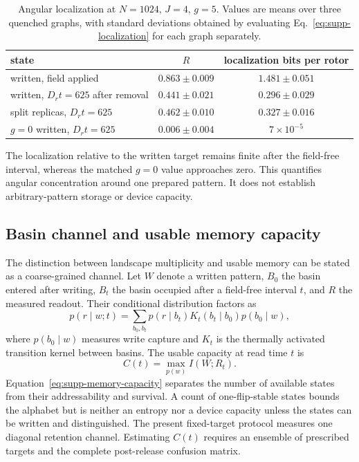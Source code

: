 \documentclass[aps,prl,onecolumn,superscriptaddress,nofootinbib]{revtex4-2}
\begin{document}
\begin{table}[ht]
\centering
\caption{Angular localization at \(N=1024\), \(J=4\), \(g=5\). Values are
means over three quenched graphs, with standard deviations obtained by
evaluating Eq.~\eqref{eq:supp-localization} for each graph separately.}
\label{tab:supp-localization}
\begin{ruledtabular}
\begin{tabular}{lcc}
state & \(R\) & localization bits per rotor\\
\hline
written, field applied & \(0.863\pm0.009\) & \(1.481\pm0.051\)\\
written, \(D_rt=625\) after removal & \(0.441\pm0.021\) & \(0.296\pm0.029\)\\
split replicas, \(D_rt=625\) & \(0.462\pm0.010\) & \(0.327\pm0.016\)\\
\(g=0\) written, \(D_rt=625\) & \(0.006\pm0.004\) & \(7\times10^{-5}\)\\
\end{tabular}
\end{ruledtabular}
\end{table}

The localization relative to the written target remains finite after the
field-free interval, whereas the matched \(g=0\) value approaches zero. This
quantifies angular concentration around one prepared pattern. It does not
establish arbitrary-pattern storage or device capacity.

\subsection{Basin channel and usable memory capacity}

The distinction between landscape multiplicity and usable memory can be
stated as a coarse-grained channel. Let \(W\) denote a written pattern,
\(B_0\) the basin entered after writing, \(B_t\) the basin occupied after a
field-free interval \(t\), and \(R\) the measured readout. Their conditional
distribution factors as
\begin{equation}
 p(r\mid w;t)=\sum_{b_0,b_t}p(r\mid b_t)
 K_t(b_t\mid b_0)p(b_0\mid w),
 \label{eq:supp-basin-channel}
\end{equation}
where \(p(b_0\mid w)\) measures write capture and \(K_t\) is the thermally
activated transition kernel between basins. The usable capacity at read time
\(t\) is
\begin{equation}
 C(t)=\max_{p(w)} I(W;R_t).
 \label{eq:supp-memory-capacity}
\end{equation}
Equation~\eqref{eq:supp-memory-capacity} separates the number of available
states from their addressability and survival. A count of one-flip-stable
states bounds the alphabet but is neither an entropy nor a device capacity
unless the states can be written and distinguished. The present fixed-target
protocol measures one diagonal retention channel. Estimating \(C(t)\) requires
an ensemble of prescribed targets and the complete post-release confusion
matrix.
\end{document}
